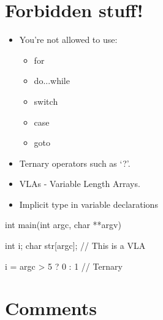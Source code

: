 \documentclass{42-en}
\begin{document}
    \section{Forbidden stuff!}

        \begin{itemize}

            \item You're not allowed to use:

                \begin{itemize}

                    \item for
                    \item do...while
                    \item switch
                    \item case
                    \item goto

                \end{itemize}

            \item Ternary operators such as `?'.

            \item VLAs - Variable Length Arrays.

            \item Implicit type in variable declarations

        \end{itemize}

\vspace{1cm}
        
        \begin{42ccode}
    int main(int argc, char **argv)
    {
        int     i;
        char    str[argc]; // This is a VLA

        i = argc > 5 ? 0 : 1 // Ternary
    }
        \end{42ccode}
        \newpage

    \section{Comments}
\end{document}
